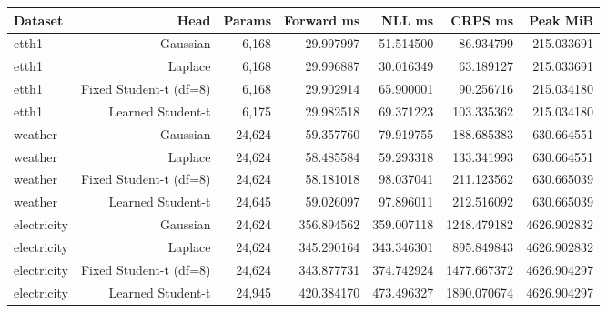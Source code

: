 \begin{tabular}{@{}lrrrrrr@{}}
\toprule
Dataset & Head & Params & Forward ms & NLL ms & CRPS ms & Peak MiB \\
\midrule
etth1 & Gaussian & 6,168 & 29.997997 & 51.514500 & 86.934799 & 215.033691 \\
etth1 & Laplace & 6,168 & 29.996887 & 30.016349 & 63.189127 & 215.033691 \\
etth1 & Fixed Student-t (df=8) & 6,168 & 29.902914 & 65.900001 & 90.256716 & 215.034180 \\
etth1 & Learned Student-t & 6,175 & 29.982518 & 69.371223 & 103.335362 & 215.034180 \\
weather & Gaussian & 24,624 & 59.357760 & 79.919755 & 188.685383 & 630.664551 \\
weather & Laplace & 24,624 & 58.485584 & 59.293318 & 133.341993 & 630.664551 \\
weather & Fixed Student-t (df=8) & 24,624 & 58.181018 & 98.037041 & 211.123562 & 630.665039 \\
weather & Learned Student-t & 24,645 & 59.026097 & 97.896011 & 212.516092 & 630.665039 \\
electricity & Gaussian & 24,624 & 356.894562 & 359.007118 & 1248.479182 & 4626.902832 \\
electricity & Laplace & 24,624 & 345.290164 & 343.346301 & 895.849843 & 4626.902832 \\
electricity & Fixed Student-t (df=8) & 24,624 & 343.877731 & 374.742924 & 1477.667372 & 4626.904297 \\
electricity & Learned Student-t & 24,945 & 420.384170 & 473.496327 & 1890.070674 & 4626.904297 \\
\bottomrule
\end{tabular}
